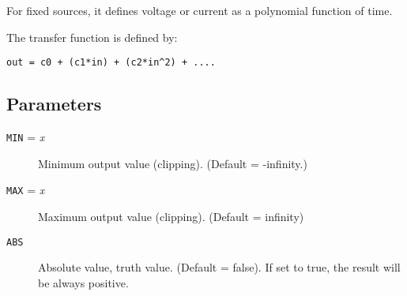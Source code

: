 For fixed sources, it defines voltage or current as a polynomial
function of time.

The transfer function is defined by:

\begin{verbatim}
out = c0 + (c1*in) + (c2*in^2) + ....
\end{verbatim}
\subsection{Parameters}

\begin{description}

\item[{\tt MIN} = {\it x}] Minimum output value (clipping).
(Default = -infinity.)

\item[{\tt MAX} = {\it x}] Maximum output value (clipping).
(Default = infinity)

\item[{\tt ABS}] Absolute value, truth value.  (Default = false).  If
set to true, the result will be always positive.

\end{description}
